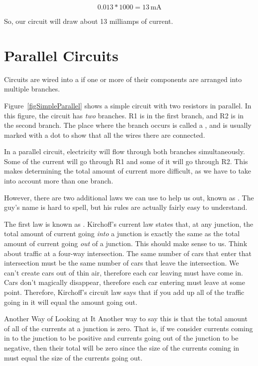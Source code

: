 $$ 0.013 * 1000 = 13\,\si{\milli\ampere}$$

So, our circuit will draw about 13 milliamps of current.

\section{Parallel Circuits}

Circuits are wired into a  if one or more of their components are arranged into multiple branches.

Figure~\ref{figSimpleParallel} shows a simple circuit with two resistors in parallel.
In this figure, the circuit has \emph{two} branches.
R1 is in the first branch, and R2 is in the second branch.
The place where the branch occurs is called a , and is usually marked with a dot to show that all the wires there are connected.


In a parallel circuit, electricity will flow through both branches simultaneously.
Some of the current will go through R1 and some of it will go through R2.
This makes determining the total amount of current more difficult, as we have to take into account more than one branch.

However, there are two additional laws we can use to help us out, known as .
The guy's name is hard to spell, but his rules are actually fairly easy to understand.

The first law is known as .
Kirchoff's current law states that, at any junction, the total amount of current going \emph{into} a junction is exactly the same as the total amount of current going \emph{out} of a junction.
This should make sense to us.
Think about traffic at a four-way intersection.
The same number of cars that enter that intersection must be the same number of cars that leave the intersection.
We can't create cars out of thin air, therefore each car leaving must have come in.
Cars don't magically disappear, therefore each car entering must leave at some point.
Therefore, Kirchoff's circuit law says that if you add up all of the traffic going in it will equal the amount going out.

\begin{advsidebar}{Another Way of Looking at It}
Another way to say this is that the total amount of all of the currents at a junction is zero.
That is, if we consider currents coming in to the junction to be positive and currents going out of the junction to be negative, then their total will be zero since the size of the currents coming in must equal the size of the currents going out.
\end{advsidebar}

